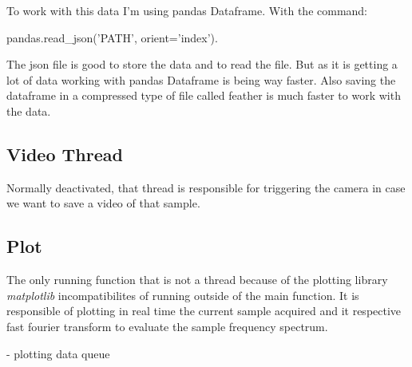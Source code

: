         To work with this data I'm using pandas Dataframe.
        With the command:
        
        pandas.read\_json('PATH', orient='index').
    
        The json file is good to store the data and to read the file. But as it is getting a lot of data working with pandas Dataframe is being way faster. Also saving the dataframe in a compressed
        type of file called feather is much faster to work with the data.
    
    \subsection{Video Thread}

        Normally deactivated, that thread is responsible for triggering the camera in case we want to save a video of that sample.
    
    \subsection{Plot}

        The only running function that is not a thread because of the plotting library \emph{matplotlib} incompatibilites of running outside of the main function. 
        It is responsible of plotting in real time the current sample acquired and it respective fast fourier transform to evaluate the sample frequency spectrum.
    
    
    - plotting data queue

\clearpage
